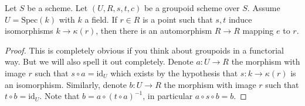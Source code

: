 \begin{lemma}
\label{lemma-groupoid-on-field-move-point}
Let $S$ be a scheme. Let $(U, R, s, t, c)$ be a groupoid scheme
over $S$. Assume $U = \text{Spec}(k)$ with $k$ a field.
If $r \in R$ is a point such that $s, t$ induce
isomorphisms $k \to \kappa(r)$, then there is an
automorphism $R \to R$ mapping $e$ to $r$.
\end{lemma}

\begin{proof}
This is completely obvious if you think about groupoids in a
functorial way. But we will also spell it out completely.
Denote $a : U \to R$ the morphism with image $r$ such that
$s \circ a = \text{id}_U$ which exists by the hypothesis
that $s : k \to \kappa(r)$ is an isomorphism. Similarly, denote
$b : U \to R$ the morphism with image $r$ such that
$t \circ b = \text{id}_U$. Note that
$b = a \circ (t \circ a)^{-1}$, in particular
$a \circ s \circ b = b$.


\end{proof}
